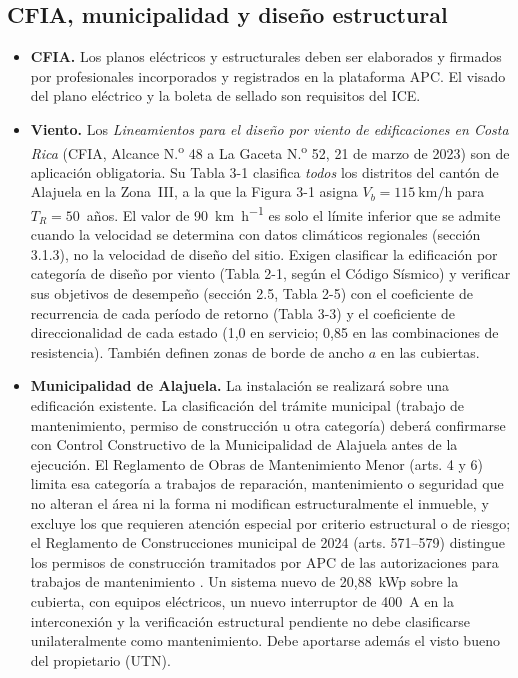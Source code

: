 \documentclass[12pt]{article}
\begin{document}
\subsection{CFIA, municipalidad y diseño estructural}
\begin{itemize}
\item \textbf{CFIA.} Los planos eléctricos y estructurales deben ser elaborados y firmados por profesionales incorporados y registrados en la plataforma APC. El visado del plano eléctrico y la boleta de sellado son requisitos del ICE.
\item \textbf{Viento.} Los \emph{Lineamientos para el diseño por viento de edificaciones en Costa Rica} (CFIA, Alcance N.\textsuperscript{o} 48 a La Gaceta N.\textsuperscript{o} 52, 21 de marzo de 2023) \cite{cfiaViento} son de aplicación obligatoria. Su Tabla 3-1 clasifica \emph{todos} los distritos del cantón de Alajuela en la Zona~III, a la que la Figura 3-1 asigna $V_b=\SI{115}{\kilo\meter\per\hour}$ para $T_R=50$~años. El valor de \SI{90}{\kilo\meter\per\hour} es solo el límite inferior que se admite cuando la velocidad se determina con datos climáticos regionales (sección 3.1.3), no la velocidad de diseño del sitio. Exigen clasificar la edificación por categoría de diseño por viento (Tabla 2-1, según el Código Sísmico) y verificar sus objetivos de desempeño (sección 2.5, Tabla 2-5) con el coeficiente de recurrencia de cada período de retorno (Tabla 3-3) y el coeficiente de direccionalidad de cada estado (1,0 en servicio; 0,85 en las combinaciones de resistencia). También definen zonas de borde de ancho $a$ en las cubiertas.
\item \textbf{Municipalidad de Alajuela.} La instalación se realizará sobre una edificación existente. La clasificación del trámite municipal (trabajo de mantenimiento, permiso de construcción u otra categoría) deberá confirmarse con Control Constructivo de la Municipalidad de Alajuela antes de la ejecución. El Reglamento de Obras de Mantenimiento Menor (arts. 4 y 6) limita esa categoría a trabajos de reparación, mantenimiento o seguridad que no alteran el área ni la forma ni modifican estructuralmente el inmueble, y excluye los que requieren atención especial por criterio estructural o de riesgo; el Reglamento de Construcciones municipal de 2024 (arts. 571--579) distingue los permisos de construcción tramitados por APC de las autorizaciones para trabajos de mantenimiento \cite{muniAlajuela}. Un sistema nuevo de 20,88~kWp sobre la cubierta, con equipos eléctricos, un nuevo interruptor de 400~A en la interconexión y la verificación estructural pendiente no debe clasificarse unilateralmente como mantenimiento. Debe aportarse además el visto bueno del propietario (UTN).
\end{itemize}
\end{document}
